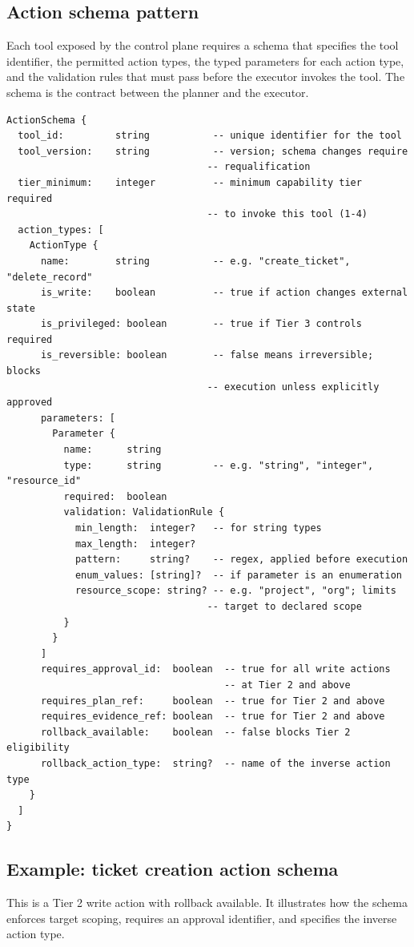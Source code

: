 \documentclass[11pt]{article}
\begin{document}
\subsection{Action schema pattern}
Each tool exposed by the control plane requires a schema that specifies the tool identifier, the permitted action types, the typed parameters for each action type, and the validation rules that must pass before the executor invokes the tool. The schema is the contract between the planner and the executor.

\begin{verbatim}
ActionSchema {
  tool_id:         string           -- unique identifier for the tool
  tool_version:    string           -- version; schema changes require
                                   -- requalification
  tier_minimum:    integer          -- minimum capability tier required
                                   -- to invoke this tool (1-4)
  action_types: [
    ActionType {
      name:        string           -- e.g. "create_ticket", "delete_record"
      is_write:    boolean          -- true if action changes external state
      is_privileged: boolean        -- true if Tier 3 controls required
      is_reversible: boolean        -- false means irreversible; blocks
                                   -- execution unless explicitly approved
      parameters: [
        Parameter {
          name:      string
          type:      string         -- e.g. "string", "integer", "resource_id"
          required:  boolean
          validation: ValidationRule {
            min_length:  integer?   -- for string types
            max_length:  integer?
            pattern:     string?    -- regex, applied before execution
            enum_values: [string]?  -- if parameter is an enumeration
            resource_scope: string? -- e.g. "project", "org"; limits
                                   -- target to declared scope
          }
        }
      ]
      requires_approval_id:  boolean  -- true for all write actions
                                      -- at Tier 2 and above
      requires_plan_ref:     boolean  -- true for Tier 2 and above
      requires_evidence_ref: boolean  -- true for Tier 2 and above
      rollback_available:    boolean  -- false blocks Tier 2 eligibility
      rollback_action_type:  string?  -- name of the inverse action type
    }
  ]
}
\end{verbatim}

\subsection{Example: ticket creation action schema}
This is a Tier 2 write action with rollback available. It illustrates how the schema enforces target scoping, requires an approval identifier, and specifies the inverse action type.
\end{document}
